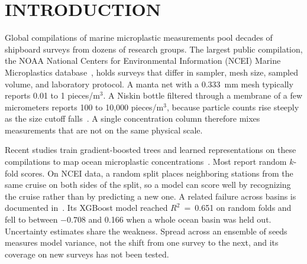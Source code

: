 \documentclass[12pt,a4paper]{report}
\newcommand{\Rsq}{$R^2$}
\begin{document}
\clearpage
\tableofcontents
\clearpage
{}
\listoftables
\clearpage
{}
\listoffigures

\chapter{INTRODUCTION}

Global compilations of marine microplastic measurements pool decades of shipboard surveys from dozens of research groups. The largest public compilation, the NOAA National Centers for Environmental Information (NCEI) Marine Microplastics database~\cite{ncei}, holds surveys that differ in sampler, mesh size, sampled volume, and laboratory protocol. A manta net with a 0.333~mm mesh typically reports 0.01 to 1 pieces/m$^3$. A Niskin bottle filtered through a membrane of a few micrometers reports 100 to 10,000 pieces/m$^3$, because particle counts rise steeply as the size cutoff falls~\cite{lindeque2020,tokai2021}. A single concentration column therefore mixes measurements that are not on the same physical scale.

Recent studies train gradient-boosted trees and learned representations on these compilations to map ocean microplastic concentrations~\cite{zhen2023,amora2025,ali2026,chan2026,dalvi2026,narayanan2026}. Most report random $k$-fold scores. On NCEI data, a random split places neighboring stations from the same cruise on both sides of the split, so a model can score well by recognizing the cruise rather than by predicting a new one. A related failure across basins is documented in~\cite{dalvi2026}. Its XGBoost model reached \Rsq{}~=~0.651 on random folds and fell to between $-0.708$ and 0.166 when a whole ocean basin was held out. Uncertainty estimates share the weakness. Spread across an ensemble of seeds measures model variance, not the shift from one survey to the next, and its coverage on new surveys has not been tested.
\end{document}
